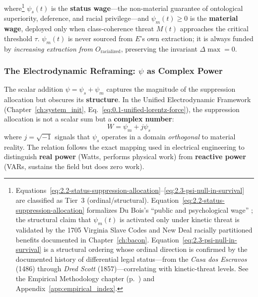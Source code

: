 where\footnote{Equations~\ref{eq:2.2-status-suppression-allocation}--\ref{eq:2.3-psi-null-in-survival} are classified as Tier~3 (ordinal/structural). Equation~\ref{eq:2.2-status-suppression-allocation} formalizes Du Bois's ``public and psychological wage'' \cite{dubois}; the structural claim that $\psi_m(t)$ is activated only under kinetic threat is validated by the 1705 Virginia Slave Codes and New Deal racially partitioned benefits documented in Chapter~\ref{ch:bacon}. Equation~\ref{eq:2.3-psi-null-in-survival} is a structural ordering whose ordinal direction is confirmed by the documented history of differential legal status---from the \textit{Casa dos Escravos} (1486) through \textit{Dred Scott} (1857)---correlating with kinetic-threat levels. See the Empirical Methodology chapter (p.~\pageref{ch:empirical_methodology}) and Appendix~\ref{app:empirical_index}.} $\psi_s(t)$ is the \textbf{status wage}---the non-material guarantee of ontological superiority, deference, and racial privilege---and $\psi_m(t) \geq 0$ is the \textbf{material wage}, deployed only when class-coherence threat $M(t)$ approaches the critical threshold $\tau$. $\psi_m(t)$ is never sourced from $E$'s own extraction; it is always funded by \textit{increasing extraction from $O_{\text{racialized}}$}, preserving the invariant $\Delta\max = 0$.

\subsubsection{The Electrodynamic Reframing: $\psi$ as Complex Power}

The scalar addition $\psi = \psi_s + \psi_m$ captures the magnitude of the
suppression allocation but obscures its \textbf{structure}. In the Unified
Electrodynamic Framework (Chapter~\ref{ch:system_init},
Eq.~\ref{eq:0.1-unified-lorentz-force}), the suppression allocation is not a
scalar sum but a \textbf{complex number}:
\begin{equation}\label{eq:2.2a-complex-suppression-allocation}
W = \psi_m + j\psi_s
\end{equation}
where $j = \sqrt{-1}$ signals that $\psi_s$ operates in a domain
\emph{orthogonal} to material reality. The relation follows the exact
mapping used in electrical engineering to distinguish \textbf{real power}
(Watts, performs physical work) from \textbf{reactive power} (VARs, sustains the
field but does zero work).

